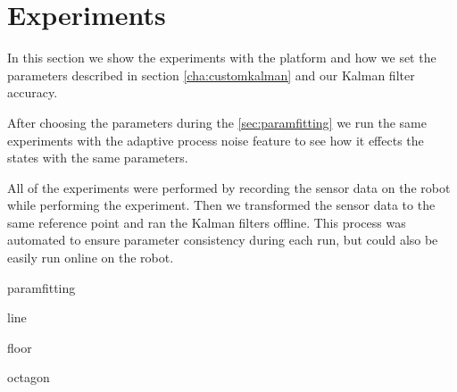 \documentclass[class=report, crop=false]{standalone}
\begin{document}
\chapter{Experiments}

In this section we show the experiments with the platform and how we set the parameters described in section \ref{cha:customkalman} and our Kalman filter accuracy.

After choosing the parameters during the \ref{sec:paramfitting} we run the same experiments with the adaptive process noise feature to see how it effects the states with the same parameters.

All of the experiments were performed by recording the sensor data on the robot while performing the experiment. Then we transformed the sensor data to the same reference point and ran the Kalman filters offline. This process was automated to ensure parameter consistency during each run, but could also be easily run online on the robot.

{paramfitting}

{line}

{floor}

{octagon}
\end{document}
